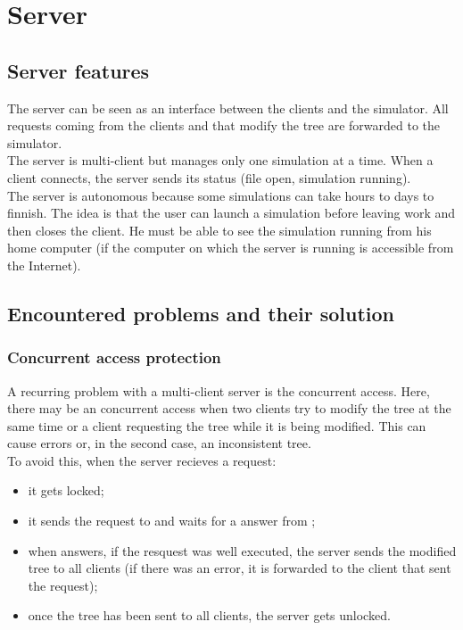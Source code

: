\chapter{Server}

\section{Server features}

The server can be seen as an interface between the clients and the simulator.
All requests coming from the clients and that modify the tree are forwarded to
the simulator.\\

The server is multi-client but manages only one simulation at a time. When a
client connects, the server sends its status (file open, simulation running).\\

The server is autonomous because some simulations can take hours to days to
finnish. The idea is that the user can launch a simulation before leaving work
and then closes the client. He must be able to see the simulation running from
his home computer (if the computer on which the server is running is accessible
from the Internet).


\section{Encountered problems and their solution}

\subsection{Concurrent access protection}

A recurring problem with a multi-client server is the concurrent access. Here,
there may be an concurrent access when two clients try to modify the tree at
the same time or a client requesting the tree while it is being modified. This
can cause errors or, in the second case, an inconsistent tree.\\

To avoid this, when the server recieves a request:
\begin{itemize}
 \item it gets locked;
 \item it sends the request to \cf and waits for a answer from \cf;
 \item when \cf answers, if the resquest was well executed, the server
sends the modified tree to all clients (if there was an error, it is forwarded
to the client that sent the request);
 \item once the tree has been sent to all clients, the server gets unlocked.
\end{itemize}

